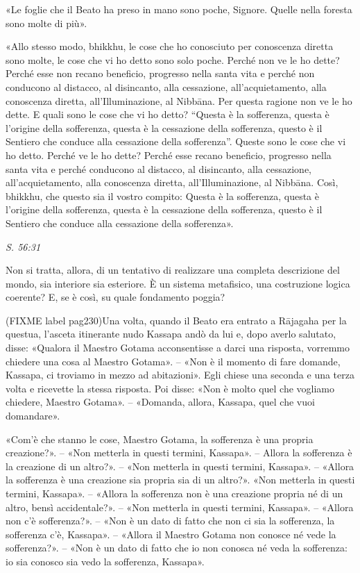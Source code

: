 «Le foglie che il Beato ha preso in mano sono poche, Signore. Quelle
nella foresta sono molte di più».


«Allo stesso modo, bhikkhu, le cose che ho conosciuto per conoscenza
diretta sono molte, le cose che vi ho detto sono solo poche. Perché non
ve le ho dette? Perché esse non recano beneficio, progresso nella santa
vita e perché non conducono al distacco, al disincanto, alla cessazione,
all’acquietamento, alla conoscenza diretta, all’Illuminazione, al
Nibbāna. Per questa ragione non ve le ho dette. E quali sono le cose che
vi ho detto? “Questa è la sofferenza, questa è l’origine della
sofferenza, questa è la cessazione della sofferenza, questo è il
Sentiero che conduce alla cessazione della sofferenza”. Queste sono le
cose che vi ho detto. Perché ve le ho dette? Perché esse recano
beneficio, progresso nella santa vita e perché conducono al distacco, al
disincanto, alla cessazione, all’acquietamento, alla conoscenza diretta,
all’Illuminazione, al Nibbāna. Così, bhikkhu, che questo sia il vostro
compito: Questa è la sofferenza, questa è l’origine della sofferenza,
questa è la cessazione della sofferenza, questo è il Sentiero che
conduce alla cessazione della sofferenza».


\emph{S. 56:31}


 Non si tratta, allora, di un tentativo di realizzare
una completa descrizione del mondo, sia interiore sia esteriore. È un
sistema metafisico, una costruzione logica coerente? E, se è così, su
quale fondamento poggia?


 (FIXME label pag230)Una volta, quando il Beato era entrato a Rājagaha per la
questua, l’asceta itinerante nudo Kassapa andò da lui e, dopo averlo
salutato, disse: «Qualora il Maestro Gotama acconsentisse a darci una
risposta, vorremmo chiedere una cosa al Maestro Gotama». – «Non è il
momento di fare domande, Kassapa, ci troviamo in mezzo ad abitazioni».
Egli chiese una seconda e una terza volta e ricevette la stessa
risposta. Poi disse: «Non è molto quel che vogliamo chiedere, Maestro
Gotama». – «Domanda, allora, Kassapa, quel che vuoi domandare».


«Com’è che stanno le cose, Maestro Gotama, la sofferenza è una propria
creazione?». – «Non metterla in questi termini, Kassapa». – Allora la
sofferenza è la creazione di un altro?». – «Non metterla in questi
termini, Kassapa». – «Allora la sofferenza è una creazione sia propria
sia di un altro?». «Non metterla in questi termini, Kassapa». – «Allora
la sofferenza non è una creazione propria né di un altro, bensì
accidentale?». – «Non metterla in questi termini, Kassapa». – «Allora
non c’è sofferenza?». – «Non è un dato di fatto che non ci sia la
sofferenza, la sofferenza c’è, Kassapa». – «Allora il Maestro Gotama non
conosce né vede la sofferenza?». – «Non è un dato di fatto che io non
conosca né veda la sofferenza: io sia conosco sia vedo la sofferenza,
Kassapa».


